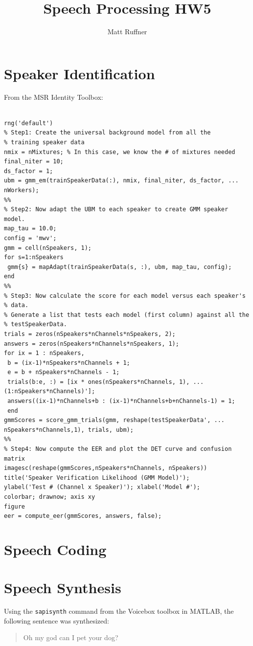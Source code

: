 \documentclass[letterpaper]{article}
\title{Speech Processing HW5}
\author{Matt Ruffner}
\begin{document}
\maketitle

\section{Speaker Identification}
From the MSR Identity Toolbox:

\begin{lstlisting}[caption = {GMM-UBM Training Code from THe MSR Toolbox.}]

rng('default')
% Step1: Create the universal background model from all the
% training speaker data
nmix = nMixtures; % In this case, we know the # of mixtures needed
final_niter = 10;
ds_factor = 1;
ubm = gmm_em(trainSpeakerData(:), nmix, final_niter, ds_factor, ...
nWorkers);
%%
% Step2: Now adapt the UBM to each speaker to create GMM speaker model.
map_tau = 10.0;
config = 'mwv';
gmm = cell(nSpeakers, 1);
for s=1:nSpeakers
 gmm{s} = mapAdapt(trainSpeakerData(s, :), ubm, map_tau, config);
end
%%
% Step3: Now calculate the score for each model versus each speaker's
% data.
% Generate a list that tests each model (first column) against all the
% testSpeakerData.
trials = zeros(nSpeakers*nChannels*nSpeakers, 2);
answers = zeros(nSpeakers*nChannels*nSpeakers, 1);
for ix = 1 : nSpeakers,
 b = (ix-1)*nSpeakers*nChannels + 1;
 e = b + nSpeakers*nChannels - 1;
 trials(b:e, :) = [ix * ones(nSpeakers*nChannels, 1), ...
(1:nSpeakers*nChannels)'];
 answers((ix-1)*nChannels+b : (ix-1)*nChannels+b+nChannels-1) = 1;
 end
gmmScores = score_gmm_trials(gmm, reshape(testSpeakerData', ...
nSpeakers*nChannels,1), trials, ubm);
%%
% Step4: Now compute the EER and plot the DET curve and confusion matrix
imagesc(reshape(gmmScores,nSpeakers*nChannels, nSpeakers))
title('Speaker Verification Likelihood (GMM Model)');
ylabel('Test # (Channel x Speaker)'); xlabel('Model #');
colorbar; drawnow; axis xy
figure
eer = compute_eer(gmmScores, answers, false);

\end{lstlisting}

\section{Speech Coding}


\section{Speech Synthesis}
Using the \texttt{sapisynth} command from the Voicebox toolbox in MATLAB, the following sentence was synthesized:
\begin{quote}
    Oh my god can I pet your dog?
\end{quote}
\end{document}
